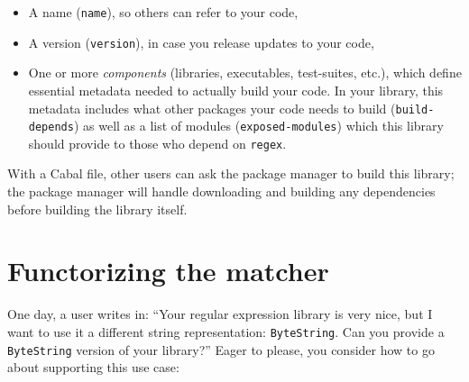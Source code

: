\begin{itemize}
    \item A name (\verb|name|), so others can refer to your code,
    \item A version (\verb|version|), in case you release updates
    to your code,
    \item One or more \emph{components} (libraries, executables,
    test-suites, etc.), which define essential metadata needed
    to actually build your code.  In your library, this metadata
    includes what other packages your code needs to build
    (\verb|build-depends|) as well as a list of modules
    (\verb|exposed-modules|) which this library should provide
    to those who depend on \verb|regex|.
\end{itemize}
%
With a Cabal file, other users can ask the package manager to build this
library; the package manager will handle downloading and building any dependencies
before building the library itself.


\section{Functorizing the matcher}

One day,
a user writes in: ``Your regular expression library is very nice,
but I want to use it a different string representation: \verb|ByteString|.
Can you provide a \verb|ByteString| version of your library?''
Eager to please, you consider how to go about supporting this use
case:

